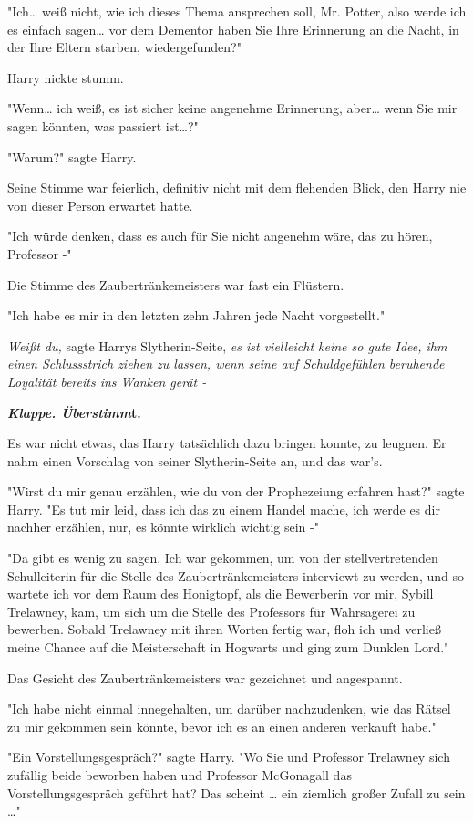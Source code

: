 {"Ich… weiß nicht, wie ich dieses Thema ansprechen soll, Mr. Potter, also werde ich es einfach sagen… vor dem Dementor haben Sie Ihre Erinnerung an die Nacht, in der Ihre Eltern starben, wiedergefunden?"

Harry nickte stumm.

"Wenn… ich weiß, es ist sicher keine angenehme Erinnerung, aber… wenn Sie mir sagen könnten, was passiert ist…?"

"Warum?" sagte Harry.

Seine Stimme war feierlich, definitiv nicht mit dem flehenden Blick, den Harry nie von dieser Person erwartet hatte.

"Ich würde denken, dass es auch für Sie nicht angenehm wäre, das zu hören, Professor -"

Die Stimme des Zaubertränkemeisters war fast ein Flüstern.

"Ich habe es mir in den letzten zehn Jahren jede Nacht vorgestellt."

\emph{Weißt du,} sagte Harrys Slytherin-Seite, \emph{es ist vielleicht keine so gute Idee, ihm einen Schlussstrich ziehen zu lassen, wenn seine auf Schuldgefühlen beruhende Loyalität} \emph{bereits ins Wanken gerät -}

\textbf{\emph{Klappe. Überstimm}t.}

Es war nicht etwas, das Harry tatsächlich dazu bringen konnte, zu leugnen. Er nahm einen Vorschlag von seiner Slytherin-Seite an, und das war's.

"Wirst du mir genau erzählen, wie du von der Prophezeiung erfahren hast?" sagte Harry. "Es tut mir leid, dass ich das zu einem Handel mache, ich werde es dir nachher erzählen, nur, es könnte wirklich wichtig sein -"

"Da gibt es wenig zu sagen. Ich war gekommen, um von der stellvertretenden Schulleiterin für die Stelle des Zaubertränkemeisters interviewt zu werden, und so wartete ich vor dem Raum des Honigtopf, als die Bewerberin vor mir, Sybill Trelawney, kam, um sich um die Stelle des Professors für Wahrsagerei zu bewerben. Sobald Trelawney mit ihren Worten fertig war, floh ich und verließ meine Chance auf die Meisterschaft in Hogwarts und ging zum Dunklen Lord."

Das Gesicht des Zaubertränkemeisters war gezeichnet und angespannt.

"Ich habe nicht einmal innegehalten, um darüber nachzudenken, wie das Rätsel zu mir gekommen sein könnte, bevor ich es an einen anderen verkauft habe."

"Ein Vorstellungsgespräch?" sagte Harry. "Wo Sie und Professor Trelawney sich zufällig beide beworben haben und Professor McGonagall das Vorstellungsgespräch geführt hat? Das scheint … ein ziemlich großer Zufall zu sein …"

}

